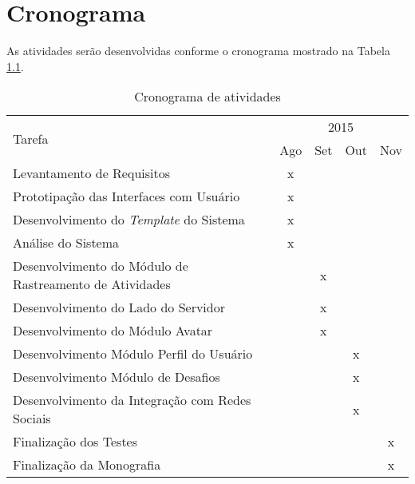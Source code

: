 \chapter{Cronograma} \label{cap:cronograma}
As atividades serão desenvolvidas conforme o cronograma mostrado na Tabela \ref{cronograma}.

\begin{table}[h]
\caption{Cronograma de atividades}
\begin{center}
\begin{tabular}{l|c|c|c|c}
\hline
\multirow{2}{*}{Tarefa} & 
\multicolumn{4}{c}{2015}\\& Ago & Set & Out & Nov 
    \\ \hline
    Levantamento de Requisitos  
        & x   & ~   & ~   & ~    
    \\ \hline
    Prototipação das Interfaces com Usuário
        & x   & ~   & ~   & ~  
    \\ \hline
    Desenvolvimento do \textit{Template} do Sistema
        & x   & ~   & ~   & ~      
    \\ \hline
    Análise do Sistema
        & x   & ~   & ~   & ~
    \\ \hline
    Desenvolvimento do Módulo de Rastreamento de Atividades 
        & ~   & x   & ~   & ~
    \\ \hline
    Desenvolvimento do Lado do Servidor                                 
        & ~   & x   & ~   & ~
    \\ \hline
    Desenvolvimento do Módulo Avatar                        
        & ~   & x   & ~   & ~
    \\ \hline
    Desenvolvimento Módulo Perfil do Usuário
        & ~   & ~   & x   & ~
    \\ \hline
    Desenvolvimento Módulo de Desafios
        & ~   & ~   & x  & ~
    \\ \hline
    Desenvolvimento da Integração com Redes Sociais         
        & ~   & ~   & x  & ~
    \\ \hline
    Finalização dos Testes                                     
        & ~   & ~   & ~  & x
    \\ \hline
    Finalização da Monografia                               
        & ~   & ~   & ~  & x
    \\ \hline
\end{tabular}
\end{center}
\label{cronograma}
\end{table}